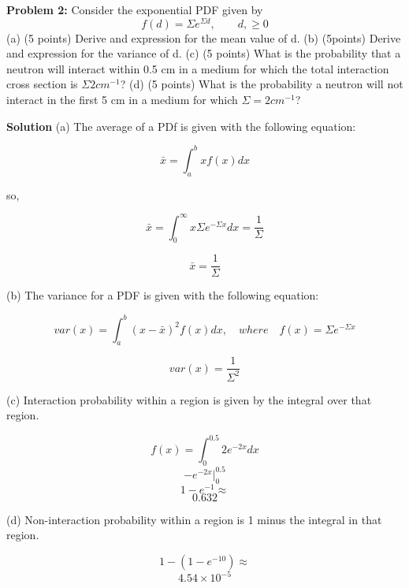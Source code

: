 \documentclass{amsart}
\theoremstyle{definition}
\begin{document}
 
\newpage
\textbf{Problem 2:} Consider the exponential PDF given by
\begin{equation*}
    f(d) = \Sigma e^{\Sigma d}, \qquad d,\geq 0
\end{equation*}
(a) (5 points) Derive and expression for the mean value of d. \newline
(b) (5points) Derive and expression for the variance of d. \newline
(c) (5 points) What is the probability that a neutron will interact within 0.5 cm in a medium for which the total interaction cross section is $\Sigma 2 cm^{-1}$? \newline
(d) (5 points) What is the probability a neutron will not interact in the first 5 cm in a medium for which $\Sigma = 2 cm^{-1}$? \newline


\textbf{Solution}
\bigbreak
(a) 
The average of a PDf is given with the following equation:

$$ \bar{x} = \int_a^b x f(x) dx $$

so,

$$ \bar{x} = \int_{0}^{\infty}{x\Sigma e^{-\Sigma x}dx} = \frac{1}{\Sigma} $$

$$ \boxed{ \bar{x} = \frac{1}{\Sigma}} $$


(b)
The variance for a PDF is given with the following equation:

$$ var(x) = \int_{a}^{b}{(x-\bar{x})^2f(x)dx} , \quad where \quad f(x) = \Sigma e^{-\Sigma x} $$

$$ \boxed{ var(x) = \frac{1}{\Sigma^2}} $$


(c) 
Interaction probability within a region is given by the integral over that region.

$$ f(x) = \int_0^{0.5} 2 e^{-2x}dx $$
$$ -e^{-2x} |^{0.5}_0 $$
$$ 1 - e^{-1} \approx $$
$$ \boxed{0.632} $$


(d)
Non-interaction probability within a region is 1 minus the integral in that region.

$$ 1 - (1 - e^{-10}) \approx $$
$$ \boxed{4.54 \times 10^{-5}} $$
\end{document}
